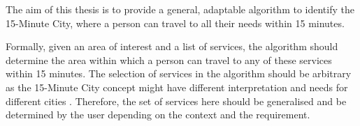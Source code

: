 The aim of this thesis is to provide a general, adaptable algorithm to identify the 15-Minute City, where a person can travel to all their needs within 15 minutes.

Formally, given an area of interest and a list of services, the algorithm should determine the area within which a person can travel to any of these services within 15 minutes. The selection of services in the algorithm should be arbitrary as the 15-Minute City concept might have different interpretation and needs for different cities \cite{marchigiani_urban_2022}. Therefore, the set of services here should be generalised and be determined by the user depending on the context and the requirement.